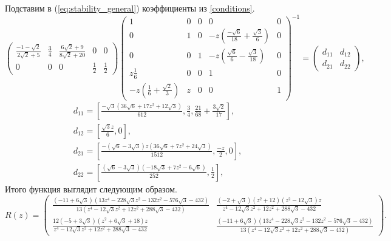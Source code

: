 \documentclass[a4paper,article,14pt]{extarticle}
\begin{document}
Подставим в (\ref{eq:stability_general}) коэффициенты из \ref{conditions}.
\begin{equation}
\begin{pmatrix}
    \frac{-1 - \sqrt{2}}{2 \sqrt{2} + 5} & \frac{3}{4} &  \frac{6 \sqrt{2} + 9}{8 \sqrt{2} + 20} & 0 & 0 \\
    0 & 0 & 0 & \frac{1}{2} & \frac{1}{2}
\end{pmatrix}
\begin{pmatrix}
    1 & 0 & 0 & 0 & 0\\
    0 & 1 & 0 & -z (\frac{-\sqrt{6}}{18} + \frac{\sqrt{3}}{6}) & 0\\
    0 & 0 & 1 & -z (\frac{\sqrt{6}}{6} - \frac{\sqrt{3}}{18}) & 0\\
    z \frac{1}{6} & 0 & 0 & 1 & 0 \\
    -z (\frac{1}{6} + \frac{\sqrt{2}}{3}) & z & 0 & 0 & 1
\end{pmatrix}^{-1}
=
 \begin{pmatrix}
    d_{11} & d_{12} \\
    d_{21} & d_{22}
\end{pmatrix},
\end{equation}
\begin{equation}
\begin{gathered}
    d_{11} = \left[
    \frac{-\sqrt{3} (36 \sqrt{6} + 17 z^{2} + 12 \sqrt{3})}{612}, \frac{3}{4}, \frac{21}{68} + \frac{3 \sqrt{2}}{17}
    \right], \\
    d_{12} = \left[
    \frac{\sqrt{3} z}{6}, 0
    \right], \\
    d_{21} = \left[
    \frac{-(\sqrt{6} - 3 \sqrt{3}) z (36 \sqrt{6} + 7 z^{2} + 24 \sqrt{3})}{1512}, \frac{-z}{2}, 0
    \right], \\
    d_{22} = \left[
    \frac{(\sqrt{6} - 3 \sqrt{3}) (-18 \sqrt{3} + 7 z^{2} - 6 \sqrt{6})}{252}, \frac{1}{2}
    \right],
\end{gathered}
\end{equation}
Итого функция выглядит следующим образом.
{\footnotesize
\begin{equation}
    R(z) = 
\begin{pmatrix}
    \frac{(-11 + 6 \sqrt{3}) (13 z^{4} - 228 \sqrt{3} z^{2} - 132 z^{2} - 576 \sqrt{3} - 432)}{13 (z^{4} - 12 \sqrt{3} z^{2} + 12 z^{2} + 288 \sqrt{3} - 432)} & 
    \frac{(-2 + \sqrt{3}) (z^{2} + 12) (z^{2} - 12 \sqrt{3}) z}{z^{4} - 12 \sqrt{3} z^{2} + 12 z^{2} + 288 \sqrt{3} - 432}\\
    \frac{12 (-5 + 3 \sqrt{3}) (z^{2} + 6 \sqrt{3} + 18) z}{z^{4} - 12 \sqrt{3} z^{2} + 12 z^{2} + 288 \sqrt{3} - 432} &
    \frac{(-11 + 6 \sqrt{3}) (13 z^{4} - 228 \sqrt{3} z^{2} - 132 z^{2} - 576 \sqrt{3} - 432)}{13 (z^{4} - 12 \sqrt{3} z^{2} + 12 z^{2} + 288 \sqrt{3} - 432)}
\end{pmatrix}. \label{eq:stability_function}
\end{equation}}
\end{document}
